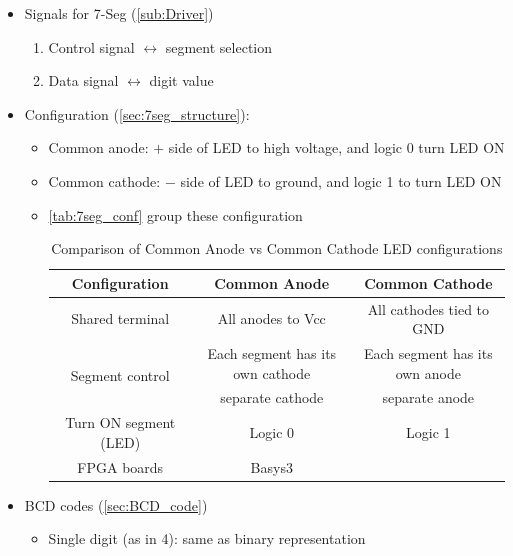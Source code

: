 \begin{itemize}

\item Signals for 7-Seg (\ref{sub:Driver})

	\begin{enumerate}
	\item Control signal $\leftrightarrow$ segment selection 
	
	\item Data signal $\leftrightarrow$ digit value
	\end{enumerate}

\item Configuration (\ref{sec:7seg_structure}):

	\begin{itemize}
	\item Common anode: $+$ side of LED to high voltage, and logic 0 turn LED ON
	
	\item Common cathode: $-$ side of LED to ground, and logic 1 to turn LED ON
	
	\item \autoref{tab:7seg_conf} group these configuration
	
	\begin{table}[h!]
\centering

\begin{tabular}{|c|c|c|}
\hline
Configuration & Common Anode & Common Cathode \\
\hline
Shared terminal & All anodes to Vcc & All cathodes tied to GND \\ \hline
\multirow{2}{*}{Segment control} & Each segment has its own cathode  & Each segment has its own anode  \\ \cline{2-3}
& separate cathode & separate anode \\ \hline
Turn ON segment (LED) & Logic 0 & Logic 1  \\ \hline
FPGA boards & Basys3 & \\ \hline
\end{tabular}
\caption{Comparison of Common Anode vs Common Cathode LED configurations}
\label{tab:7seg_conf}
\end{table}
	
	 
	\end{itemize}

\item BCD codes (\ref{sec:BCD_code})

	\begin{itemize}
	\item Single digit (as in 4): same as binary representation 
	

\end{itemize}
\end{itemize}
